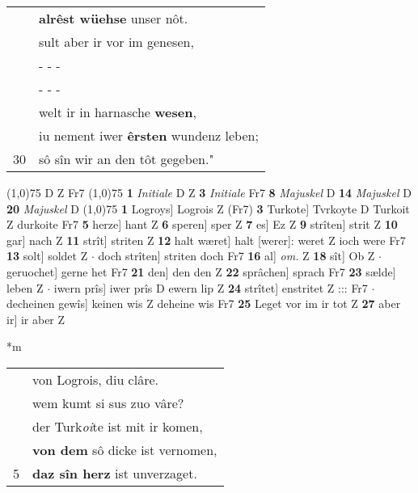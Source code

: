 \documentclass[8pt,a4paper,notitlepage]{article}
\begin{document}
\begin{table}[ht]
\begin{minipage}[t]{0.5\linewidth}
\begin{tabular}{rl}
 & \textbf{alrêst wüehse} unser nôt.\\ 
 & sult aber ir vor im genesen,\\ 
 & \multicolumn{1}{l}{ - - - }\\ 
 & \multicolumn{1}{l}{ - - - }\\ 
 & welt ir in harnasche \textbf{wesen},\\ 
 & iu nement iwer \textbf{êrsten} wundenz leben;\\ 
30 & sô sîn wir an den tôt gegeben."\\ 
\end{tabular}
\scriptsize
\line(1,0){75} \newline
D Z Fr7 \newline
\line(1,0){75} \newline
\textbf{1} \textit{Initiale} D Z  \textbf{3} \textit{Initiale} Fr7  \textbf{8} \textit{Majuskel} D  \textbf{14} \textit{Majuskel} D  \textbf{20} \textit{Majuskel} D  \newline
\line(1,0){75} \newline
\textbf{1} Logroys] Logrois Z (Fr7) \textbf{3} Turkote] Tvrkoyte D Turkoit Z durkoite Fr7 \textbf{5} herze] hant Z \textbf{6} speren] sper Z \textbf{7} es] Ez Z \textbf{9} strîten] strit Z \textbf{10} gar] nach Z \textbf{11} strît] striten Z \textbf{12} halt wæret] halt [werer]: weret Z ioch were Fr7 \textbf{13} solt] soldet Z  $\cdot$ doch strîten] striten doch Fr7 \textbf{16} al] \textit{om.} Z \textbf{18} sît] Ob Z  $\cdot$ geruochet] gerne het Fr7 \textbf{21} den] den den Z \textbf{22} sprâchen] sprach Fr7 \textbf{23} sælde] leben Z  $\cdot$ iwern prîs] iwer prîs D ewern lip Z \textbf{24} strîtet] enstritet Z ::: Fr7  $\cdot$ decheinen gewîs] keinen wis Z deheine wis Fr7 \textbf{25} Leget vor im ir tot Z \textbf{27} aber ir] ir aber Z \newline
\end{minipage}
\hspace{0.5cm}
\begin{minipage}[t]{0.5\linewidth}
\small
\begin{center}*m
\end{center}
\begin{tabular}{rl}
 & von Logrois, diu clâre.\\ 
 & wem kumt si sus zuo vâre?\\ 
 & der Turk\textit{oi}te ist mit ir komen,\\ 
 & \textbf{von dem} sô dicke ist vernomen,\\ 
5 & \textbf{daz sîn herz} ist unverzaget.\\ 

\end{tabular}
\end{minipage}
\end{table}
\end{document}
